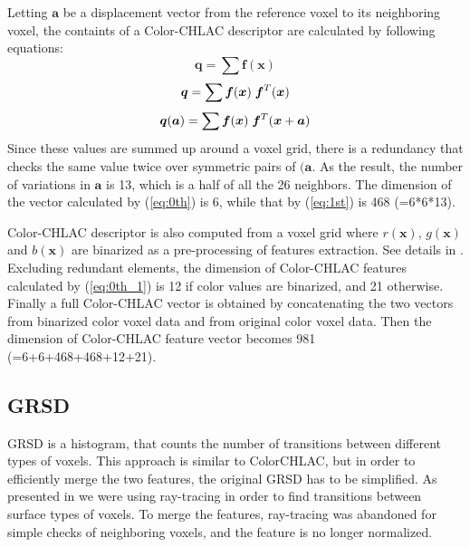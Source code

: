\documentclass[conference]{sty/IEEEtran}
\begin{document}
%
Letting ${\bm a}$ be a displacement vector from the reference voxel to its neighboring voxel, 
   the containts of a Color-CHLAC descriptor are calculated by following equations:
\begin{equation}\label{eq:0th}
  {\bm q} = \sum \bm{f}({\bm x})
\end{equation}
\begin{equation}\label{eq:0th_1}
  {\bm q} = \sum \bm{f}({\bm x}) \hspace{1mm}\bm{f}^T({\bm x}) \\
\end{equation}
\begin{equation}\label{eq:1st}
  {\bm q}({\bm a}) = \sum \bm{f}({\bm x}) \hspace{1mm}\bm{f}^T({\bm x}+{\bm a}) \\
\end{equation}
%
Since these values are summed up around a voxel grid, there is a redundancy that checks the same value twice over symmetric pairs of ${(\bm a}$. 
As the result, the number of variations in ${\bm a}$ is 13, which is a half of all the 26 neighbors.
The dimension of the vector calculated by (\ref{eq:0th}) is 6, while that by (\ref{eq:1st}) is 468 (=6*6*13).

Color-CHLAC descriptor is also computed from a voxel grid where $r(\bm{x})$, $g(\bm{x})$ and $b(\bm{x})$ are binarized as a pre-processing of features extraction. See details in \cite{kanezaki2010icra}. 
Excluding redundant elements, the dimension of Color-CHLAC features calculated by (\ref{eq:0th_1}) is 12 if color values are binarized, and 21 otherwise. 
Finally a full Color-CHLAC vector is obtained by concatenating the two vectors from binarized color voxel data and from original color voxel data. 
Then the dimension of Color-CHLAC feature vector becomes 981 (=6+6+468+468+12+21).

\subsection{GRSD}
%
GRSD is a histogram, that counts the number of transitions between different types of voxels.
This approach is similar to ColorCHLAC, but in order to efficiently merge the two features,
the original GRSD has to be simplified. As presented in \cite{GRSD10Humanoids} we were using
ray-tracing in order to find transitions between surface types of voxels. To merge the features,
ray-tracing was abandoned for simple checks of neighboring voxels, and the feature is no longer normalized.
\end{document}
